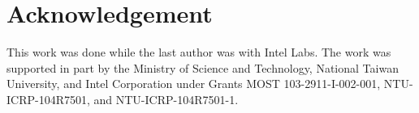 \section{Acknowledgement} \label{sec:ack}
This work was done while the last author was with Intel Labs.
The work was supported in part by the Ministry of Science and Technology, National Taiwan University, and Intel Corporation under Grants MOST 103-2911-I-002-001, NTU-ICRP-104R7501, and NTU-ICRP-104R7501-1.
